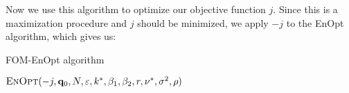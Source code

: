 Now we use this algorithm to optimize our objective function $j$. Since this is a maximization procedure and $j$ should be minimized, we apply $-j$ to the EnOpt algorithm, which gives us:

\begin{algorithm}[H]%
\caption{FOM-EnOpt algorithm}
\begin{algorithmic}[1]
\State \Return $\Call{EnOpt}{-j,\mathbf{q}_0,N,\varepsilon,k^*,\beta_1,\beta_2,r,\nu^*,\sigma^2,\rho}$
\EndFunction
\end{algorithmic}
\end{algorithm}